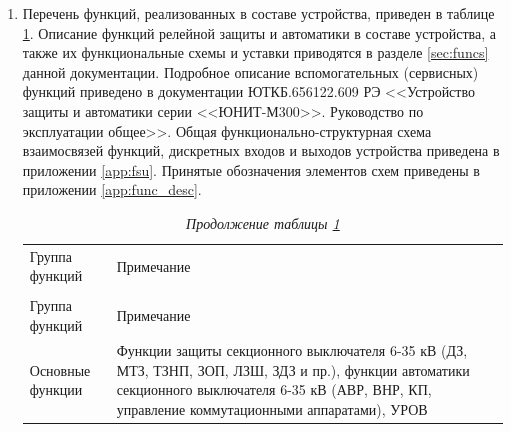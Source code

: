 \begin{enumerate}

\item
Перечень функций, реализованных в составе устройства, приведен в таблице \ref{desc:tbl1}. Описание функций релейной защиты и автоматики в составе устройства, а также их функциональные схемы и уставки приводятся в разделе \ref{sec:funcs} данной документации. Подробное описание вспомогательных (сервисных) функций приведено в документации ЮТКБ.656122.609 РЭ <<Устройство защиты и автоматики серии <<ЮНИТ-М300>>. Руководство по эксплуатации общее>>. Общая функционально-структурная схема взаимосвязей функций, дискретных входов и выходов устройства приведена в приложении \ref{app:fsu}. Принятые обозначения элементов схем приведены в приложении \ref{app:func_desc}.

\setlength{\extrarowheight}{0.05cm} %
\small
\begin{longtable}
{|>{\centering\arraybackslash}m{3.2cm}|>{\centering\arraybackslash}m{13.7cm}|}
\caption{Функции в составе устройства <<ЮНИТ-М300-СВ>>\hfill\vspace{-0.5\baselineskip}}\label{desc:tbl1}\\ 
\hhline{|-|-|}
\rowcolor{gray!30}
Группа функций & Примечание \\ 
\hhline{|-|-|}
\endfirsthead

\caption*{\hspace{3pt}\emph{Продолжение таблицы \ref{desc:tbl1}\hfill\vspace{-0.5\baselineskip}}} \\ %
\hhline{|-|-|}
\rowcolor{gray!30}
Группа функций & Примечание \\ 
\hhline{|-|-|}
\endhead
\hhline{|-|-|}

\endfoot
\endlastfoot

\centering Основные функции & \raggedright\arraybackslash Функции защиты секционного выключателя 6-35 кВ (ДЗ, МТЗ, ТЗНП, ЗОП, ЛЗШ, ЗДЗ и пр.), функции автоматики секционного выключателя 6-35 кВ (АВР, ВНР, КП, управление коммутационными аппаратами), УРОВ  \\  \hline


\end{longtable}
\end{enumerate}
